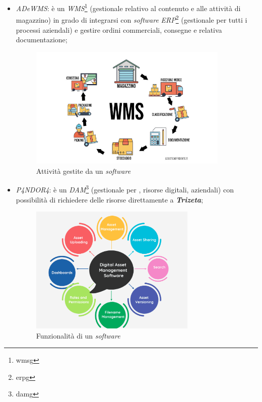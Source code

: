\begin{itemize}
    \item \textit{ADeWMS}: è un \textit{WMS}\footnote{\gls{wmsg}} (gestionale relativo al contenuto e alle attività di magazzino) in grado di integrarsi con \textit{software} \textit{ERP}\footnote{\gls{erpg}} (gestionale per tutti i processi aziendali) e gestire ordini commerciali, consegne e relativa documentazione;
    \begin{figure}[H]
        \centering
        \includegraphics[width=0.9\textwidth]{images/wms.jpg}
        \caption[Funzionalità di un \textit{software WMS}]{Attività gestite da un \textit{software } \footnotemark}
    \end{figure}
    {}
    
    \item \textit{P4NDOR4}: è un \textit{DAM}\footnote{\gls{damg}} (gestionale per , risorse digitali, aziendali) con possibilità di richiedere delle risorse direttamente a \textit{\textbf{Trizeta}};
    \begin{figure}[H]
        \centering
        \includegraphics[width=0.75\textwidth]{images/dam.png}
        \caption[Funzionalità di un \textit{software DAM}]{Funzionalità di un \textit{software } \footnotemark}
    \end{figure}
    {}


\end{itemize}
